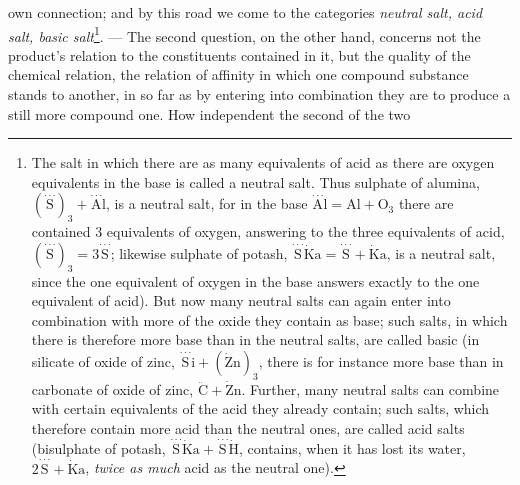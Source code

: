 \documentclass[12pt,a4paper]{book}
\begin{document}
own connection; and by this road we come to the categories \emph{neutral salt,
acid salt, basic salt}\footnote{The salt in which there are as many equivalents
of acid as there are oxygen equivalents in the base is called a neutral salt.
Thus sulphate of alumina,
$(\stackrel{\cdot\cdot\cdot}{\mathrm{S}})_3 +
\stackrel{\cdot\cdot\cdot}{\mathrm{A}}\mathrm{l}$, is a neutral salt, for in
the base $\stackrel{\cdot\cdot\cdot}{\mathrm{A}}\mathrm{l} =
\mathrm{Al} + \mathrm{O}_3$ there are contained 3 equivalents of oxygen,
answering to the three equivalents of acid,
$(\stackrel{\cdot\cdot\cdot}{\mathrm{S}})_3 =
3\stackrel{\cdot\cdot\cdot}{\mathrm{S}}$; likewise sulphate of potash,
$\stackrel{\cdot\cdot\cdot}{\mathrm{S}}\dot{\mathrm{K}}\mathrm{a} =
\stackrel{\cdot\cdot\cdot}{\mathrm{S}} + \dot{\mathrm{K}}\mathrm{a}$,
is a neutral salt, since the one equivalent of oxygen in the base answers
exactly to the one
equivalent of acid). But now many neutral salts can again enter into
combination with more of the oxide they contain as base; such salts, in which
there is therefore more base than in the neutral salts, are called basic (in
silicate of oxide of zinc,
$\stackrel{\cdot\cdot\cdot}{\mathrm{S}}\mathrm{i} +
(\dot{\mathrm{Z}}\mathrm{n})_3$,
there is for instance more base than in carbonate of oxide of zinc,
$\ddot{\mathrm{C}} + \dot{\mathrm{Z}}\mathrm{n}$.
Further, many neutral salts can combine with certain equivalents of the acid
they already contain; such salts, which therefore contain more acid than the
neutral ones, are called acid salts (bisulphate of potash,
$\stackrel{\cdot\cdot\cdot}{\mathrm{S}}\dot{\mathrm{K}}\mathrm{a} +
\stackrel{\cdot\cdot\cdot}{\mathrm{S}}\dot{\mathrm{H}}$,
contains,
when it has lost its water,
$2\stackrel{\cdot\cdot\cdot}{\mathrm{S}} + \dot{\mathrm{K}}\mathrm{a}$,
\emph{twice as much} acid
as the neutral one).}. --- The second question, on the other hand, concerns not
the product's relation to the constituents contained in it, but the quality of
the chemical relation, the relation of affinity in which one compound substance
stands to another, in so far as by entering into combination they are to
produce a still more compound one. How independent the second of the two
\end{document}
